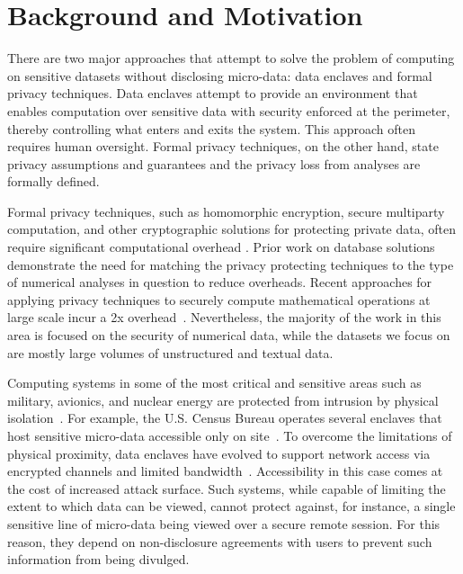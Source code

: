 \section{Background and Motivation} \label{sec:background}

There are two major approaches that attempt to solve the problem of computing on sensitive
datasets without disclosing micro-data: data enclaves and formal privacy techniques. 
Data enclaves attempt to
provide an environment that enables computation over sensitive data with security enforced
at the perimeter, thereby controlling what enters and exits the system. This approach often requires human oversight.
Formal privacy techniques, on the other hand, state privacy assumptions and guarantees and the privacy loss
from analyses are formally defined.

Formal privacy techniques, such as homomorphic encryption, secure multiparty computation, and
other cryptographic solutions for protecting private data, often require significant computational
overhead \cite{gentry2012fully,naehrig2011can}. Prior work on database solutions
\cite{popa2011cryptdb} demonstrate the need for matching the privacy protecting techniques to the type of
numerical analyses in question to reduce overheads. 
Recent approaches for applying privacy techniques to
securely compute mathematical operations at large scale incur a 2x overhead~\cite{kepner2014computing}.
Nevertheless, the majority of the work in this area is focused on the security of numerical data, while the datasets
we focus on are mostly large volumes of unstructured and textual data.

Computing systems in some of the most critical and sensitive areas such as military, avionics,
and nuclear energy are protected from intrusion by physical isolation~\cite{byres2013air, ross2013security}.
For example, the U.S. Census Bureau operates several enclaves that host sensitive micro-data accessible
only on site~\cite{rdc_uscensus}. To overcome the limitations of physical proximity, data enclaves
have evolved to support network access via encrypted channels and limited bandwidth~\cite{lane2008using, grossman2016toward}.
Accessibility in this case comes at the cost of increased attack surface. Such systems, while
capable of limiting the extent to which data can be viewed, cannot protect against, for instance, a single
sensitive line of micro-data being viewed over a secure remote session. For this reason, they depend on non-disclosure
agreements with users to prevent such information from being divulged.

